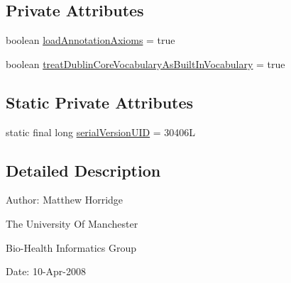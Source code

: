 \subsection*{Private Attributes}
\begin{DoxyCompactItemize}
\item 
boolean \hyperlink{classorg_1_1semanticweb_1_1owlapi_1_1model_1_1_o_w_l_ontology_manager_properties_ab79421cd96e2850d2116db79afcbe938}{load\-Annotation\-Axioms} = true
\item 
boolean \hyperlink{classorg_1_1semanticweb_1_1owlapi_1_1model_1_1_o_w_l_ontology_manager_properties_acb9009f12a2fad11a2962f1c262f34b6}{treat\-Dublin\-Core\-Vocabulary\-As\-Built\-In\-Vocabulary} = true
\end{DoxyCompactItemize}
\subsection*{Static Private Attributes}
\begin{DoxyCompactItemize}
\item 
static final long \hyperlink{classorg_1_1semanticweb_1_1owlapi_1_1model_1_1_o_w_l_ontology_manager_properties_a7e9d775354574cb4cc1c81450fe2c710}{serial\-Version\-U\-I\-D} = 30406\-L
\end{DoxyCompactItemize}


\subsection{Detailed Description}
Author\-: Matthew Horridge\par
 The University Of Manchester\par
 Bio-\/\-Health Informatics Group\par
 Date\-: 10-\/\-Apr-\/2008\par
\par
 

